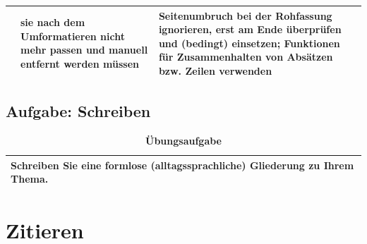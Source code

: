 \documentclass[]{book}
\theoremstyle{definition}
\theoremstyle{definition}
\theoremstyle{definition}
\theoremstyle{remark}
\begin{document}
\begin{longtable}[]{@{}lll@{}}
\begin{minipage}[t]{0.13\columnwidth}
\end{minipage} & \begin{minipage}[t]{0.41\columnwidth}\raggedright\strut
sie nach dem Umformatieren nicht mehr passen und manuell entfernt werden
müssen\strut
\end{minipage} & \begin{minipage}[t]{0.38\columnwidth}\raggedright\strut
Seitenumbruch bei der Rohfassung ignorieren, erst am Ende überprüfen und
(bedingt) einsetzen; Funktionen für Zusammenhalten von Absätzen bzw.
Zeilen verwenden\strut
\end{minipage}\tabularnewline
\bottomrule
\end{longtable}

\section{Aufgabe: Schreiben}\label{aufgabe-schreiben}

\begin{longtable}[]{@{}l@{}}
\caption{\textbf{\label{tab:aufgabe6-test} Übungsaufgabe}}\tabularnewline
\toprule
\begin{minipage}[t]{0.97\columnwidth}\raggedright\strut
Schreiben Sie eine formlose (alltagssprachliche) Gliederung zu Ihrem
Thema.\strut
\end{minipage}\tabularnewline
\bottomrule
\end{longtable}

\hypertarget{zitieren}{\chapter{Zitieren}\label{zitieren}}
\end{document}
